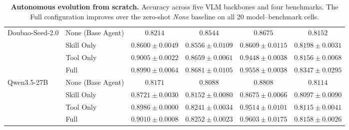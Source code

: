 \begin{table}[t]
\begin{tabular}{llcccc}
\midrule

\multirow{4}{*}{Doubao-Seed-2.0}
  & None (Base Agent)  &$0.8214$  &$0.8544$  &$0.8675$  &$0.8152$  \\
  & Skill Only         &$0.8600 {\pm} 0.0049$  &$0.8556{\pm} 0.0109$  &$0.8609 {\pm} 0.0115$  &$\underline{0.8198} {\pm} 0.0031$  \\
  & Tool Only          &$\mathbf{0.9005} {\pm} 0.0022$  &$\underline{0.8659} {\pm} 0.0061$  &$\underline{0.9448} {\pm} 0.0038$  & $0.8156 {\pm} 0.0068$  \\
  & Full               &$\underline{0.8990} {\pm} 0.0064$  &$\mathbf{0.8681} {\pm} 0.0105$  &$\mathbf{0.9558} {\pm} 0.0038$  &$\mathbf{0.8347} {\pm} 0.0295$  \\

\midrule

\multirow{4}{*}{Qwen3.5-27B}
  & None (Base Agent)  &$0.8171$  &$0.8088$  &$0.8808$  &$0.8114$  \\
  & Skill Only         &$0.8721 {\pm} 0.0030$  &$0.8152{\pm} 0.0080$  &$0.8675 {\pm} 0.0066$  &$0.8097 {\pm} 0.0090$  \\
  & Tool Only          &$\underline{0.8986} {\pm} 0.0000$  &$\underline{0.8241} {\pm} 0.0034$  &$\underline{0.9514} {\pm} 0.0101$  & $\underline{0.8115} {\pm} 0.0041$  \\
  & Full               &$\mathbf{0.9010} {\pm} 0.0008$  &$\mathbf{0.8252} {\pm} 0.0023$  &$\mathbf{0.9603} {\pm} 0.0175$  &$\mathbf{0.8158} {\pm} 0.0026$  \\



\bottomrule
\end{tabular}
\caption{%
  \textbf{Autonomous evolution from scratch.} Accuracy across five VLM backbones and four
  benchmarks. The Full \sysname{} configuration improves over the zero-shot \emph{None}
  baseline on all 20 model--benchmark cells.
}
\label{tab:evolution_full}
\end{table}


